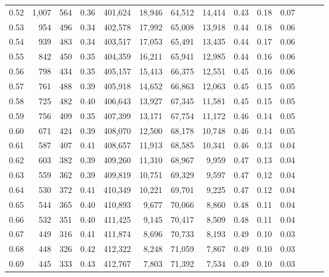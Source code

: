 \begin{tabular}{rrrrrrrrrrrrrr}
0.52 &   1,007 &    564 &  0.36 &  401,624 &   18,946 &  64,512 &  14,414 &  0.43 &  0.18 &      0.07 \\
0.53 &     954 &    496 &  0.34 &  402,578 &   17,992 &  65,008 &  13,918 &  0.44 &  0.18 &      0.06 \\
0.54 &     939 &    483 &  0.34 &  403,517 &   17,053 &  65,491 &  13,435 &  0.44 &  0.17 &      0.06 \\
0.55 &     842 &    450 &  0.35 &  404,359 &   16,211 &  65,941 &  12,985 &  0.44 &  0.16 &      0.06 \\
0.56 &     798 &    434 &  0.35 &  405,157 &   15,413 &  66,375 &  12,551 &  0.45 &  0.16 &      0.06 \\
0.57 &     761 &    488 &  0.39 &  405,918 &   14,652 &  66,863 &  12,063 &  0.45 &  0.15 &      0.05 \\
0.58 &     725 &    482 &  0.40 &  406,643 &   13,927 &  67,345 &  11,581 &  0.45 &  0.15 &      0.05 \\
0.59 &     756 &    409 &  0.35 &  407,399 &   13,171 &  67,754 &  11,172 &  0.46 &  0.14 &      0.05 \\
0.60 &     671 &    424 &  0.39 &  408,070 &   12,500 &  68,178 &  10,748 &  0.46 &  0.14 &      0.05 \\
0.61 &     587 &    407 &  0.41 &  408,657 &   11,913 &  68,585 &  10,341 &  0.46 &  0.13 &      0.04 \\
0.62 &     603 &    382 &  0.39 &  409,260 &   11,310 &  68,967 &   9,959 &  0.47 &  0.13 &      0.04 \\
0.63 &     559 &    362 &  0.39 &  409,819 &   10,751 &  69,329 &   9,597 &  0.47 &  0.12 &      0.04 \\
0.64 &     530 &    372 &  0.41 &  410,349 &   10,221 &  69,701 &   9,225 &  0.47 &  0.12 &      0.04 \\
0.65 &     544 &    365 &  0.40 &  410,893 &    9,677 &  70,066 &   8,860 &  0.48 &  0.11 &      0.04 \\
0.66 &     532 &    351 &  0.40 &  411,425 &    9,145 &  70,417 &   8,509 &  0.48 &  0.11 &      0.04 \\
0.67 &     449 &    316 &  0.41 &  411,874 &    8,696 &  70,733 &   8,193 &  0.49 &  0.10 &      0.03 \\
0.68 &     448 &    326 &  0.42 &  412,322 &    8,248 &  71,059 &   7,867 &  0.49 &  0.10 &      0.03 \\
0.69 &     445 &    333 &  0.43 &  412,767 &    7,803 &  71,392 &   7,534 &  0.49 &  0.10 &      0.03 \\

\end{tabular}
